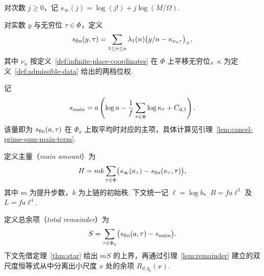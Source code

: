 \begin{definition}[无穷位导数大小]
\label{def:jet-size}
\emitthmsource
对次数 $j\ge0$，记 $s_\infty(j)=\log(j!)+j\log(M/\Omega)$.
\end{definition}

\begin{definition}[逐位带权素数和]
\label{def:weighted-prime-sum}
\emitthmsource
对实数 $y$ 与无穷位 $\tau\in\Phi$，定义
\begin{equation}
 s_{\rm fin}(y,\tau)
 =\sum_{1\le n\le a}\lambda_1(n)
       \bigl(y/n-\kappa_{\nu_n\tau}\bigr)_+ ,
\label{eq:weighted-prime-sum}
\end{equation}
其中 $\nu_n$ 按定义~\ref{def:infinite-place-coordinates} 在 $\Phi$ 上平移无穷位，$\kappa$ 为定义~\ref{def:admissible-data} 给出的两档位权.
\end{definition}

\begin{definition}[带权素数和的平均主项]
\label{def:prime-sum-main-term}
\emitthmsource
记
\[
 s_{\rm main}
 =a\left(\log a-\frac1f\sum_{\tau\in\Phi}\log\kappa_\tau+C_{d,1}\right).
\]
该量即为 $s_{\rm fin}(a,\tau)$ 在 $\Phi_a$ 上取平均时对应的主项，具体计算见引理~\ref{lem:cancel-prime-sum-main-term}.
\end{definition}

\begin{definition}[主量]
\label{def:main-amount}
\emitthmsource
定义主量（\emph{main amount}）为
\begin{equation}
 H=mk\sum_{\tau\in\Phi}
       \bigl(s_\infty(\kappa_\tau)-s_{\rm fin}(\kappa_\tau,\tau)\bigr),
\label{eq:main-amount}
\end{equation}
其中 $m$ 为提升步数，$k$ 为上链的初始秩. 下文统一记
$\ell=\log b$、$B=fa\ell^3$ 及 $L=fa\ell^4$.
\end{definition}

\begin{definition}[总余项]
\label{def:total-remainder}
\emitthmsource
定义总余项（\emph{total remainder}）为
\[
 S=\sum_{\tau\in\Phi_a}\bigl(s_{\rm fin}(a,\tau)-s_{\rm main}\bigr).
\]
下文先借定理~\ref{thm:star} 给出 $mS$ 的上界，再通过引理~\ref{lem:remainder} 建立的双尺度恒等式从中分离出小尺度 $x$ 处的余项 $R_{d,q_0}(x)$.
\end{definition}

